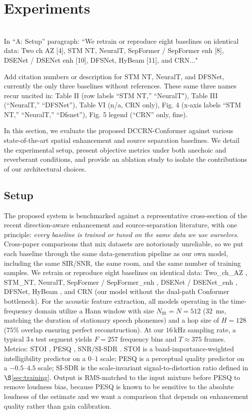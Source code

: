 \documentclass[journal,10pt]{IEEEtran}
\begin{document}
\section{Experiments}
\label{sec:results}
{\color{red}  \\
In ``A: Setup'' paragraph: ``We retrain or reproduce eight baselines on identical data: Two ch AZ [4], STM NT, NeuralT, SepFormer / SepFormer enh [8], DSENet / DSENet enh [10], DFSNet, HyBeam [11], and CRN..."

Add citation numbers or description for STM NT, NeuralT, and DFSNet, currently the only three baselines without references.
These same three names recur uncited in: Table II (row labels ``STM NT,'' ``NeuralT"), Table III (``NeuralT,'' ``DFSNet''), Table VI (n/a, CRN only), Fig. 4 (x-axis labels ``STM NT,'' ``NeuralT,'' ``Dfsnet''), Fig. 5 legend (``CRN'' only, fine).}

In this section, we evaluate the proposed DCCRN-Conformer against various state-of-the-art spatial enhancement and source separation baselines. We detail the experimental setup, present objective metrics under both anechoic and reverberant conditions, and provide an ablation study to isolate the contributions of our architectural choices.
\subsection{Setup}
The proposed system is benchmarked against a representative cross-section of the recent direction-aware enhancement and source-separation literature, with one principle: \emph{every baseline is trained or tuned on the same data we use ourselves}. Cross-paper comparisons that mix datasets are notoriously unreliable, so we put each baseline through the same data-generation pipeline as our own model, including the same SIR/SNR, the same room, and the same number of training samples. We retrain or reproduce eight baselines on identical data: Two\_ch\_AZ \cite{khandelwal2021two}, STM\_NT, NeuralT, SepFormer / SepFormer\_enh \cite{subakan2021attention}, DSENet / DSENet\_enh \cite{kovalyov2021dsenet}, DFSNet, HyBeam \cite{barilan2022hybeam}, and CRN (our model without the dual-path Conformer bottleneck). For the acoustic feature extraction, all models operating in the time-frequency domain utilize a Hann window with size \(N_{\mathrm{fft}}\!=\!N\!=\!512\) (\(32\)~ms, matching the duration of stationary speech phonemes) and a hop size of \(H\!=\!128\) (\(75\%\) overlap ensuring perfect reconstruction). At our \(16\,\mathrm{kHz}\) sampling rate, a typical \(3\,\mathrm{s}\) test segment yields \(F=257\) frequency bins and \(T\approx 375\) frames. Metrics: STOI \cite{stoi2011}, PESQ \cite{pesq}, SNR/SI-SDR \cite{leroux2019sdr}. STOI is a band-importance-weighted intelligibility predictor on a \(0\)--\(1\) scale; PESQ is a perceptual quality predictor on a \(-0.5\)--\(4.5\) scale; SI-SDR is the scale-invariant signal-to-distortion ratio defined in \(\S\)\ref{sec:training}. Output is RMS-matched to the input mixture before PESQ to remove loudness bias, because PESQ is known to be sensitive to the absolute loudness of the estimate and we want a comparison that depends on enhancement quality rather than gain calibration.
\end{document}
